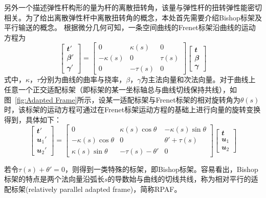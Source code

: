 另外一个描述弹性杆构形的量为杆的离散扭转角，该量与弹性杆的扭转弹性能密切相关。为了给出离散弹性杆中离散扭转角的概念，本处首先需要介绍Bishop标架\cite{Bishop1975there}及平行输送\cite{bergou2008discrete,bergou2010discrete}的概念。
根据微分几何\cite{do2016differential}可知，一条空间曲线的Frenet标架沿曲线的运动方程为
\begin{equation}
		\begin{bmatrix} \mathbfit{t}'\\ \mathbfit{\beta}'\\ \mathbfit{\gamma}' \end{bmatrix} =
		\begin{bmatrix}
			0 & \kappa (s) & 0 \\
			-\kappa (s) & 0 & \tau (s) \\
			0 & -\tau (s) & 0
		\end{bmatrix}
		\begin{bmatrix} \mathbfit{t}\\ \mathbfit{\beta}\\ \mathbfit{\gamma} \end{bmatrix}
\end{equation}
式中，$\kappa$，$\tau$分别为曲线的曲率与挠率，$\beta$，$\gamma$为主法向量和次法向量。对于曲线上任意一个正交适配标架（即标架的某一坐标轴总与曲线切线保持共线），如图~\ref{fig:Adapted Frame}所示，设某一适配标架与Frenet标架的相对旋转角为$\theta (s)$时，该标架的运动方程可通过在Frenet标架运动方程的基础上进行向量的旋转变换得到，具体如下：
\begin{equation}
	\begin{bmatrix} \mathbfit{t}'\\ \mathbfit{u}_1'\\ \mathbfit{u}_2' \end{bmatrix} =
	\begin{bmatrix}
		0 & \kappa (s) \cos \theta & -\kappa (s) \sin \theta \\
		-\kappa (s) \cos \theta & 0 & \theta' + \tau (s) \\
		\kappa (s) \sin \theta & -\tau (s)-\theta' & 0
	\end{bmatrix}
	\begin{bmatrix} \mathbfit{t}\\ \mathbfit{u}_1\\ \mathbfit{u}_2 \end{bmatrix}
	\label{eq:motion equation of any frame}
\end{equation}

若令$\tau (s)+\theta'=0$，则得到一类特殊的标架，即Bishop标架。容易看出，Bishop标架的特点是两个法向量沿弧长$s$的导数始与曲线的切线共线，称为相对平行的适配标架(relatively parallel adapted frame)，简称RPAF。


